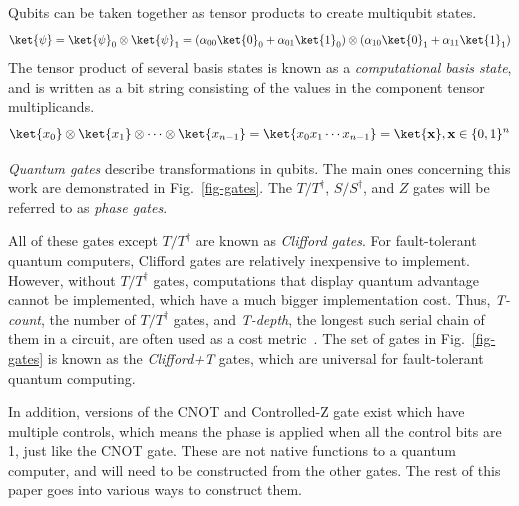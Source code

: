 
Qubits can be taken together as tensor products to create multiqubit states.
\begin{equation}
\label{eq-multi-qb}
\ket{\psi} = \ket{\psi}_0 \otimes \ket{\psi}_1 =(\alpha_{00} \ket{0}_0 + \alpha_{01} \ket{1}_0) \otimes
(\alpha_{10} \ket{0}_1 + \alpha_{11} \ket{1}_1)
\end{equation}
The tensor product of several basis states is known as a \emph{computational basis state},
and is written as a bit string consisting of the values in the component tensor multiplicands.
\begin{equation}
\ket{x_0}\otimes\ket{x_1}\otimes\cdots\otimes\ket{x_{n-1}}=\ket{x_0 x_1 \cdots x_{n-1}}=\ket{\mathbf{x}},
\mathbf{x} \in \{0,1\}^n
\end{equation}


{\it Quantum gates} describe transformations in qubits. The main ones concerning this work
are demonstrated in Fig.~\ref{fig-gates}. The $T/T^{\dagger}$, $S/S^{\dagger}$, and $Z$
gates will be referred to as {\it phase gates}.

All of these gates except $T/T^{\dagger}$ are known as {\it Clifford gates}. For
fault-tolerant quantum computers, Clifford gates are relatively inexpensive to implement.
However, without $T/T^{\dagger}$ gates, computations that display quantum advantage
cannot be implemented, which have a much bigger implementation cost. Thus,
{\it T-count}, the number of $T/T^{\dagger}$ gates, and {\it T-depth}, the longest such
serial chain of them in a circuit, are often used as a cost metric~\cite{amy-meet-in-middle}.
The set of gates in Fig.~\ref{fig-gates} is known as the {\it Clifford+T} gates, which are
universal for fault-tolerant quantum computing.

In addition, versions of the CNOT and Controlled-Z gate exist which have multiple controls,
which means the phase is applied when all the control bits are 1, just like the CNOT gate.
These are not native functions to a quantum computer, and will need to be constructed from
the other gates. The rest of this paper goes into various ways to construct them.


